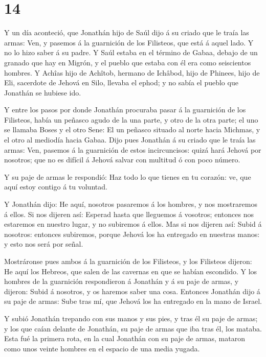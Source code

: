 \hypertarget{section-13}{%
\section{14}\label{section-13}}

 Y un día aconteció, que Jonathán hijo de Saúl dijo á su
criado que le traía las armas: Ven, y pasemos á la guarnición de los
Filisteos, que está á aquel lado. Y no lo hizo saber á su padre.
 Y Saúl estaba en el término de Gabaa, debajo de un granado
que hay en Migrón, y el pueblo que estaba con él era como seiscientos
hombres.  Y Achîas hijo de Achîtob, hermano de Ichâbod, hijo
de Phinees, hijo de Eli, sacerdote de Jehová en Silo, llevaba el ephod;
y no sabía el pueblo que Jonathán se hubiese ido.

 Y entre los pasos por donde Jonathán procuraba pasar á la
guarnición de los Filisteos, había un peñasco agudo de la una parte, y
otro de la otra parte; el uno se llamaba Boses y el otro Sene:
 El un peñasco situado al norte hacia Michmas, y el otro al
mediodía hacia Gabaa.  Dijo pues Jonathán á su criado que le
traía las armas: Ven, pasemos á la guarnición de estos incircuncisos:
quizá hará Jehová por nosotros; que no es difícil á Jehová salvar con
multitud ó con poco número.

 Y su paje de armas le respondió: Haz todo lo que tienes en
tu corazón: ve, que aquí estoy contigo á tu voluntad.

 Y Jonathán dijo: He aquí, nosotros pasaremos á los hombres,
y nos mostraremos á ellos.  Si nos dijeren así: Esperad
hasta que lleguemos á vosotros; entonces nos estaremos en nuestro lugar,
y no subiremos á ellos.  Mas si nos dijeren así: Subid á
nosotros: entonces subiremos, porque Jehová los ha entregado en nuestras
manos: y esto nos será por señal.

 Mostráronse pues ambos á la guarnición de los Filisteos, y
los Filisteos dijeron: He aquí los Hebreos, que salen de las cavernas en
que se habían escondido.  Y los hombres de la guarnición
respondieron á Jonathán y á su paje de armas, y dijeron: Subid á
nosotros, y os haremos saber una cosa. Entonces Jonathán dijo á su paje
de armas: Sube tras mí, que Jehová los ha entregado en la mano de
Israel.

 Y subió Jonathán trepando con sus manos y sus pies, y tras
él su paje de armas; y los que caían delante de Jonathán, su paje de
armas que iba tras él, los mataba.  Esta fué la primera
rota, en la cual Jonathán con su paje de armas, mataron como unos veinte
hombres en el espacio de una media yugada.

